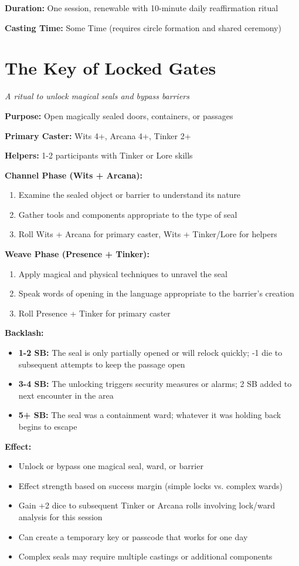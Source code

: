 \textbf{Duration:} One session, renewable with 10-minute daily reaffirmation ritual

\textbf{Casting Time:} Some Time (requires circle formation and shared ceremony)

\section*{The Key of Locked Gates}
\textit{A ritual to unlock magical seals and bypass barriers}

\textbf{Purpose:} Open magically sealed doors, containers, or passages

\textbf{Primary Caster:} Wits 4+, Arcana 4+, Tinker 2+

\textbf{Helpers:} 1-2 participants with Tinker or Lore skills

\textbf{Channel Phase (Wits + Arcana):}
\begin{enumerate}
\item Examine the sealed object or barrier to understand its nature
\item Gather tools and components appropriate to the type of seal
\item Roll Wits + Arcana for primary caster, Wits + Tinker/Lore for helpers
\end{enumerate}

\textbf{Weave Phase (Presence + Tinker):}
\begin{enumerate}
\item Apply magical and physical techniques to unravel the seal
\item Speak words of opening in the language appropriate to the barrier's creation
\item Roll Presence + Tinker for primary caster
\end{enumerate}

\textbf{Backlash:}
\begin{itemize}
\item \textbf{1-2 SB:} The seal is only partially opened or will relock quickly; -1 die to subsequent attempts to keep the passage open
\item \textbf{3-4 SB:} The unlocking triggers security measures or alarms; 2 SB added to next encounter in the area
\item \textbf{5+ SB:} The seal was a containment ward; whatever it was holding back begins to escape
\end{itemize}

\textbf{Effect:}
\begin{itemize}
\item Unlock or bypass one magical seal, ward, or barrier
\item Effect strength based on success margin (simple locks vs. complex wards)
\item Gain +2 dice to subsequent Tinker or Arcana rolls involving lock/ward analysis for this session
\item Can create a temporary key or passcode that works for one day
\item Complex seals may require multiple castings or additional components
\end{itemize}

